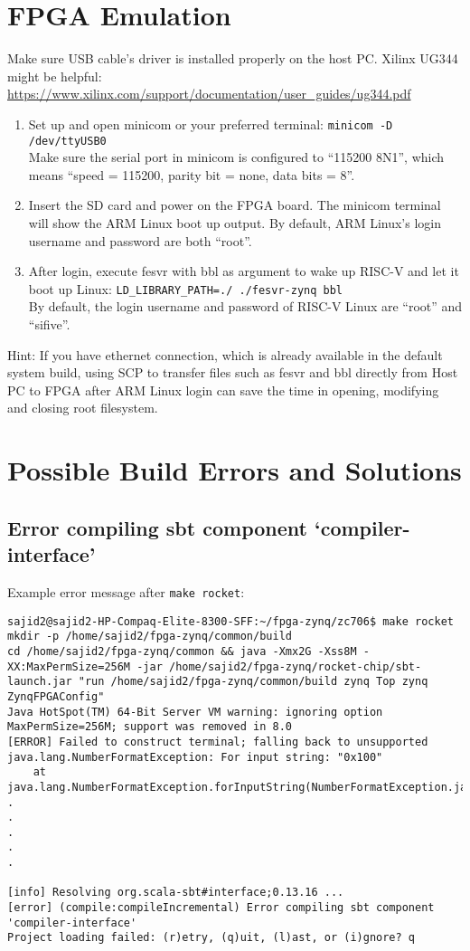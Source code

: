 \documentclass[a4paper,11pt]{article}
\begin{document}
\section{FPGA Emulation}
Make sure USB cable's driver is installed properly on the host PC. Xilinx UG344 might be helpful: \url{https://www.xilinx.com/support/documentation/user_guides/ug344.pdf}
\begin{enumerate}
\item Set up and open minicom or your preferred terminal:
{\tt minicom -D /dev/ttyUSB0}\\
Make sure the serial port in minicom is configured to ``115200 8N1'', which means ``speed = 115200, parity bit = none, data bits = 8''.

\item Insert the SD card and power on the FPGA board. The minicom terminal will show the ARM Linux boot up output. By default, ARM Linux's login username and password are both ``root''.

\item After login, execute fesvr with bbl as argument to wake up RISC-V and let it boot up Linux:
{\tt LD\_LIBRARY\_PATH=./ ./fesvr-zynq bbl}\\
By default, the login username and password of RISC-V Linux are ``root'' and ``sifive''.
\end{enumerate}

Hint: If you have ethernet connection, which is already available in the default system build, using SCP to transfer files such as fesvr and bbl directly from Host PC to FPGA after ARM Linux login can save the time in opening, modifying and closing root filesystem.

\section{Possible Build Errors and Solutions}
\subsection{Error compiling sbt component  `compiler-interface'}
Example error message after {\tt make rocket}:
\begin{lstlisting}
sajid2@sajid2-HP-Compaq-Elite-8300-SFF:~/fpga-zynq/zc706$ make rocket
mkdir -p /home/sajid2/fpga-zynq/common/build
cd /home/sajid2/fpga-zynq/common && java -Xmx2G -Xss8M -XX:MaxPermSize=256M -jar /home/sajid2/fpga-zynq/rocket-chip/sbt-launch.jar "run /home/sajid2/fpga-zynq/common/build zynq Top zynq ZynqFPGAConfig"
Java HotSpot(TM) 64-Bit Server VM warning: ignoring option MaxPermSize=256M; support was removed in 8.0
[ERROR] Failed to construct terminal; falling back to unsupported
java.lang.NumberFormatException: For input string: "0x100"
	at java.lang.NumberFormatException.forInputString(NumberFormatException.java:65)
.
.
.
.
.

[info] Resolving org.scala-sbt#interface;0.13.16 ...
[error] (compile:compileIncremental) Error compiling sbt component 'compiler-interface'
Project loading failed: (r)etry, (q)uit, (l)ast, or (i)gnore? q
\end{lstlisting}
\end{document}
